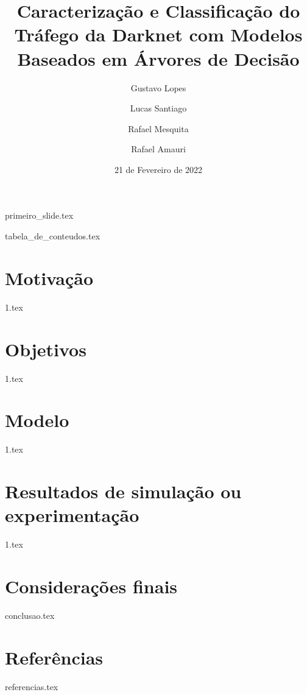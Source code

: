 \documentclass[aspectratio=169]{beamer}
\title{Caracterização e Classificação do Tráfego da Darknet com
 Modelos Baseados em Árvores de Decisão}
\author{Gustavo Lopes \and Lucas Santiago \and Rafael Mesquita \and Rafael Amauri }
\institute{Pontifícia Universidade Católica de Minas Gerais}
\date{21 de Fevereiro de 2022}
\begin{document}
    {primeiro_slide.tex}

    {tabela_de_conteudos.tex}


    \section{Motivação}

    {1.tex}

    \section{Objetivos}

    {1.tex}


    \section{Modelo}

    {1.tex}


    \section{Resultados de simulação ou experimentação}

    {1.tex}

    \section{Considerações finais}

    {conclusao.tex}
    
    \section{Referências}

    \nocite{sbc2021}

    {referencias.tex}

\end{document}
